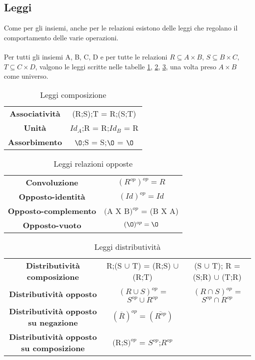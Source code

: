 \subsection{Leggi}
Come per gli insiemi, anche per le relazioni esistono delle leggi che regolano il comportamento delle varie operazioni. \\ \\
Per tutti gli insiemi A, B, C, D e per tutte le relazioni $R \subseteq A \times B$, $S \subseteq B \times C$, $T \subseteq C \times D$, valgono le leggi scritte nelle tabelle \ref{tab:leggi-composizione}, \ref{tab:leggi-relazioni-opposte}, \ref{tab:leggi-distributività}, una volta preso $A \times B$ come universo.
\begin{table}[h!]
    \setlength{\tabcolsep}{8pt}
    \renewcommand{\arraystretch}{2}
    \centering
    \begin{tabular}{|c|c|}
    \hline
        \textbf{Associatività} & (R;S);T = R;(S;T) \\
        \textbf{Unità} & $Id_A$;R = R;$Id_B$ = R \\
        \textbf{Assorbimento} & $\O$;S = S;$\O$ = $\O$ \\ \hline
    \end{tabular}
    \caption{Leggi composizione}
    \label{tab:leggi-composizione}
\end{table}
\begin{table}[h!]
    \vspace{-10pt}
    \centering
    \setlength{\tabcolsep}{8pt}
    \renewcommand{\arraystretch}{2}
    \begin{tabular}{|c|c|}
        \hline
        \textbf{Convoluzione} & $(R^{op})^{op} = R$ \\
        \textbf{Opposto-identità} & $(Id)^{op} = Id$ \\
        \textbf{Opposto-complemento} & $($A X B$)^{op}$ = (B X A) \\
        \textbf{Opposto-vuoto} & $(\O)^{op} = \O$ \\ \hline
    \end{tabular}
    \caption{Leggi relazioni opposte}
    \label{tab:leggi-relazioni-opposte}
\end{table}
\begin{table}[h!]
    \vspace{-10pt}
    \centering
    \setlength{\tabcolsep}{8pt}
    \renewcommand{\arraystretch}{2}
    \begin{tabular}{|c|c|c|}
        \hline
        \textbf{Distributività composizione} & R;(S $\cup$ T) = (R;S) $\cup$ (R;T) & (S $\cup$ T); R = (S;R) $\cup$ (T;R) \\
        \textbf{Distributività opposto} & $(R \cup S)^{op}$ = $S^{op} \cup R^{op}$ & $(R \cap S)^{op}$ = $S^{op} \cap R^{op}$ \\
        \textbf{Distributività opposto su negazione} & $(\overline{R})^{op} = (\overline{R^{op}})$ & \\
        \textbf{Distributività opposto su composizione} & $($R;S$)^{op}$ = $S^{op}$;$R^{op}$ & \\ \hline
    \end{tabular}
    \caption{Leggi distributività}
    \label{tab:leggi-distributività}
\end{table}
